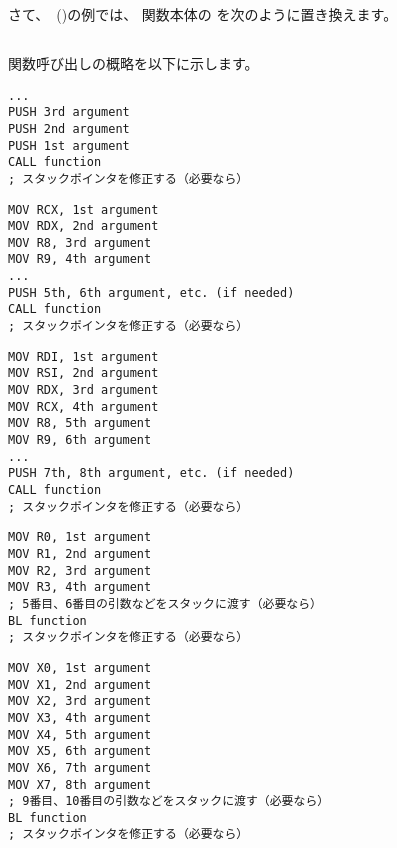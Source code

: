 \mysection{\PrintfSeveralArgumentsSectionName}

さて、\emph{\HelloWorldSectionName}~()の例では、 
\main 関数本体の \printf を次のように置き換えます。







\subsection{\Conclusion{}}

関数呼び出しの概略を以下に示します。

\begin{lstlisting}[caption=x86,style=customasmx86]
...
PUSH 3rd argument
PUSH 2nd argument
PUSH 1st argument
CALL function
; スタックポインタを修正する（必要なら）
\end{lstlisting}

\begin{lstlisting}[caption=x64 (MSVC),style=customasmx86]
MOV RCX, 1st argument
MOV RDX, 2nd argument
MOV R8, 3rd argument
MOV R9, 4th argument
...
PUSH 5th, 6th argument, etc. (if needed)
CALL function
; スタックポインタを修正する（必要なら）
\end{lstlisting}

\begin{lstlisting}[caption=x64 (GCC),style=customasmx86]
MOV RDI, 1st argument
MOV RSI, 2nd argument
MOV RDX, 3rd argument
MOV RCX, 4th argument
MOV R8, 5th argument
MOV R9, 6th argument
...
PUSH 7th, 8th argument, etc. (if needed)
CALL function
; スタックポインタを修正する（必要なら）
\end{lstlisting}

\begin{lstlisting}[caption=ARM,style=customasmARM]
MOV R0, 1st argument
MOV R1, 2nd argument
MOV R2, 3rd argument
MOV R3, 4th argument
; 5番目、6番目の引数などをスタックに渡す（必要なら）
BL function
; スタックポインタを修正する（必要なら）
\end{lstlisting}

\begin{lstlisting}[caption=ARM64,style=customasmARM]
MOV X0, 1st argument
MOV X1, 2nd argument
MOV X2, 3rd argument
MOV X3, 4th argument
MOV X4, 5th argument
MOV X5, 6th argument
MOV X6, 7th argument
MOV X7, 8th argument
; 9番目、10番目の引数などをスタックに渡す（必要なら）
BL function
; スタックポインタを修正する（必要なら）
\end{lstlisting}

